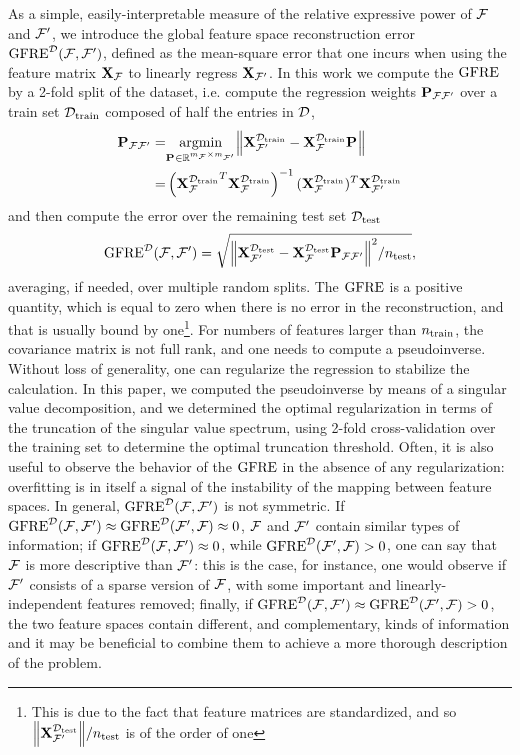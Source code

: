 As a simple, easily-interpretable measure of the relative expressive power of $\mathcal{F}$ and $\mathcal{F}^{\prime}$, we introduce the global feature space reconstruction error $\operatorname{GFRE}^{\mathcal{D}}(\mathcal{F},\mathcal{F}^{\prime})$, defined as the mean-square error that one incurs when using the feature matrix $\mathbf{X}_{\mathcal{F}}$ to linearly regress $\mathbf{X}_{\mathcal{F}^{\prime}}$. 
In this work we compute the $\operatorname{GFRE}$ by a 2-fold split of the dataset, i.e. compute the regression weights $\mathbf{P}_{{\mathcal{F}}{\mathcal{F}^{\prime}}}$ over a train set $\mathcal{D}_{\mathrm{train}}$ composed of half the entries in $\mathcal{D}$,
\begin{equation}
\begin{split}
\mathbf{P}_{{\mathcal{F}}{\mathcal{F}^{\prime}}}= &
\underset{\mathbf{P}_{{}{}}\in\mathbb{R}^{m_{\mathcal{F}}\times m_{\mathcal{F}^{\prime}}}}{\operatorname{argmin}}
\norm{\mathbf{X}^{\mathcal{D}_{\mathrm{train}}}_{\mathcal{F}^{\prime}} - \mathbf{X}^{\mathcal{D}_{\mathrm{train}}}_{\mathcal{F}} \mathbf{P}_{{}{}}  }\\
=&\left({\mathbf{X}_{\mathcal{F}}^{\mathcal{D}_{\mathrm{train}}}}^T \mathbf{X}_{\mathcal{F}}^{\mathcal{D}_{\mathrm{train}}}\right)^{-1}
(\mathbf{X}_{\mathcal{F}}^{\mathcal{D}_{\mathrm{train}}})^T\mathbf{X}_{\mathcal{F}^{\prime}}^{\mathcal{D}_{\mathrm{train}}}
\end{split}\label{eq:proj-ff1}
\end{equation}
and then compute the error over the remaining test set $\mathcal{D}_{\mathrm{test}}$
\begin{equation}
\operatorname{GFRE}^{\mathcal{D}}(\mathcal{F},\mathcal{F}^{\prime}) = \sqrt{{\norm{\mathbf{X}^{\mathcal{D}_{\mathrm{test}}}_{\mathcal{F}^{\prime}} - \mathbf{X}^{\mathcal{D}_{\mathrm{test}}}_{\mathcal{F}} \mathbf{P}_{{\mathcal{F}}{\mathcal{F}^{\prime}}}  }^2}/n_{\mathrm{test}}},
\label{eq:GFRE}
\end{equation}
averaging, if needed, over multiple random splits.  The $\operatorname{GFRE}$ is a positive quantity, which is equal to zero when there is no error in the reconstruction, and that is usually bound by one\footnote{This is due to the fact that feature matrices are standardized, and so $\norm{\mathbf{X}^{\mathcal{D}_{\mathrm{test}}}_{\mathcal{F}^{\prime}}}/n_{\mathrm{test}} $ is of the order of one}.
For numbers of features larger than $n_{\mathrm{train}}$, the covariance matrix is not full rank, and one needs to compute a pseudoinverse. Without loss of generality, one can regularize the regression to stabilize the calculation. In this paper, we computed the pseudoinverse by means of a singular value decomposition, and we determined the optimal regularization in terms of the truncation of the singular value spectrum, using 2-fold cross-validation over the training set to determine the optimal truncation threshold. Often, it is also useful to observe the behavior of the $\operatorname{GFRE}$ in the absence of any regularization: overfitting is in itself a signal of the instability of the mapping between feature spaces.
In general, $\operatorname{GFRE}^{\mathcal{D}}(\mathcal{F},\mathcal{F}^{\prime})$ is not symmetric. If $\operatorname{GFRE}^{\mathcal{D}}(\mathcal{F},\mathcal{F}^{\prime})\approx\operatorname{GFRE}^{\mathcal{D}}(\mathcal{F}^{\prime},\mathcal{F})\approx 0$, $\mathcal{F}$ and $\mathcal{F}^{\prime}$ contain similar types of information; if $\operatorname{GFRE}^{\mathcal{D}}(\mathcal{F},\mathcal{F}^{\prime})\approx 0$, while $\operatorname{GFRE}^{\mathcal{D}}(\mathcal{F}^{\prime},\mathcal{F})>0$, one can say that $\mathcal{F}$ is more descriptive than $\mathcal{F}^{\prime}$: this is the case, for instance, one would observe if $\mathcal{F}^{\prime}$ consists of a sparse version of $\mathcal{F}$, with some important and linearly-independent features removed; finally, if  $\operatorname{GFRE}^{\mathcal{D}}(\mathcal{F},\mathcal{F}^{\prime})\approx\operatorname{GFRE}^{\mathcal{D}}(\mathcal{F}^{\prime},\mathcal{F})>0$, the two feature spaces contain different, and complementary, kinds of information and it may be beneficial to combine them to achieve a more thorough description of the problem.


